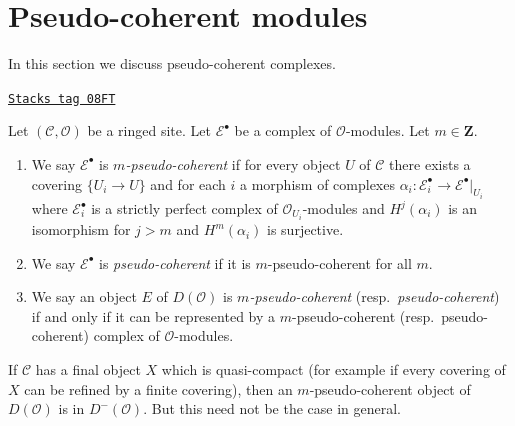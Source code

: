 \section{Pseudo-coherent modules}
\label{sites-cohomology-section-pseudo-coherent}
In this section we discuss pseudo-coherent complexes.

\begin{definition}
\label{sites-cohomology-definition-pseudo-coherent}
\href{https://stacks.math.columbia.edu/tag/08FT}{\texttt{Stacks tag 08FT}}

Let $(\mathcal{C}, \mathcal{O})$ be a ringed site. Let $\mathcal{E}^\bullet$
be a complex of $\mathcal{O}$-modules. Let $m \in \mathbf{Z}$.
\begin{enumerate}
\item We say $\mathcal{E}^\bullet$ is {\it $m$-pseudo-coherent}
if for every object $U$ of $\mathcal{C}$ there exists a covering
$\{U_i \to U\}$ and for each $i$ a morphism of complexes
$\alpha_i : \mathcal{E}_i^\bullet \to \mathcal{E}^\bullet|_{U_i}$
where $\mathcal{E}_i^\bullet$ is a strictly perfect complex of
$\mathcal{O}_{U_i}$-modules and $H^j(\alpha_i)$ is an isomorphism
for $j > m$ and $H^m(\alpha_i)$ is surjective.
\item We say $\mathcal{E}^\bullet$ is {\it pseudo-coherent}
if it is $m$-pseudo-coherent for all $m$.
\item We say an object $E$ of $D(\mathcal{O})$ is
{\it $m$-pseudo-coherent} (resp.\ {\it pseudo-coherent})
if and only if it can be represented by a $m$-pseudo-coherent
(resp.\ pseudo-coherent) complex of $\mathcal{O}$-modules.
\end{enumerate}
\end{definition}

If $\mathcal{C}$ has a final object $X$ which is quasi-compact
(for example if every covering of $X$ can be refined by a finite covering),
then an $m$-pseudo-coherent object of $D(\mathcal{O})$ is in
$D^-(\mathcal{O})$. But this need not be the case in general.

